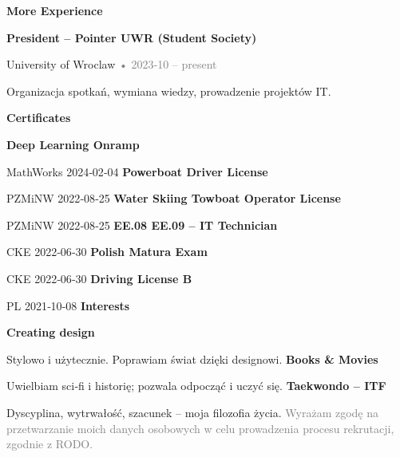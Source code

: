 \documentclass[11pt,a4paper]{article}
\newcommand{\sectiontitle}[1]{\vspace{2pt}\textbf{#1}\par\vspace{4pt}}
\begin{document}
\newpage
\sectiontitle{More Experience}
\textbf{President – Pointer UWR (Student Society)}\par\textcolor{accent}{University of Wroclaw} \textcolor{gray}{• 2023‑10 – present}\par Organizacja spotkań, wymiana wiedzy, prowadzenie projektów IT.\par
\vspace{10pt}
\sectiontitle{Certificates}
\textbf{Deep Learning Onramp}\par MathWorks \hfill 2024‑02‑04\vspace{4pt}
\textbf{Powerboat Driver License}\par PZMiNW \hfill 2022‑08‑25\vspace{4pt}
\textbf{Water Skiing Towboat Operator License}\par PZMiNW \hfill 2022‑08‑25\vspace{4pt}
\textbf{EE.08 EE.09 – IT Technician}\par CKE \hfill 2022‑06‑30\vspace{4pt}
\textbf{Polish Matura Exam}\par CKE \hfill 2022‑06‑30\vspace{4pt}
\textbf{Driving License B}\par PL \hfill 2021‑10‑08
\vspace{10pt}
\sectiontitle{Interests}
\textbf{Creating design}\par Stylowo i użytecznie. Poprawiam świat dzięki designowi.\vspace{4pt}
\textbf{Books \& Movies}\par Uwielbiam sci‑fi i historię; pozwala odpocząć i uczyć się.\vspace{4pt}
\textbf{Taekwondo – ITF}\par Dyscyplina, wytrwałość, szacunek – moja filozofia życia.
\vfill\small\textcolor{gray}{Wyrażam zgodę na przetwarzanie moich danych osobowych w celu prowadzenia procesu rekrutacji, zgodnie z RODO.}
\end{document}
